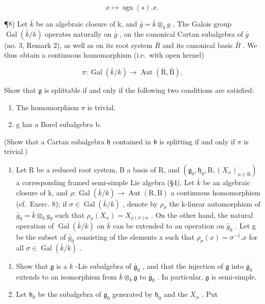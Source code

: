 \[
x \mapsto \operatorname{sgn} (s). x.
\]

¶8) Let \(\bar{k}\) be an algebraic closure of k, and \(\bar{g} = \bar{k} \otimes_{k} g\) . The Galois group \(\operatorname{Gal}(\bar{k}/k)\) operates naturally on \(\bar{g}\) , on the canonical Cartan subalgebra of \(\bar{g}\) (no. 3, Remark 2), as well as on its root system \(\bar{R}\) and its canonical basis \(\bar{B}\) . We thus obtain a continuous homomorphism (i.e.~with open kernel)

\[
\pi : \operatorname{Gal} (\bar {k} / k) \to \operatorname{Aut} (\bar {\mathrm{R}}, \bar {\mathrm{B}}).
\]

Show that \(\mathfrak{g}\) is splittable if and only if the following two conditions are satisfied:

\begin{enumerate}
\def\labelenumi{(\roman{enumi})}
\item
  The homomorphism \(\pi\) is trivial.
\item
  g has a Borel subalgebra b.
\end{enumerate}

(Show that a Cartan subalgebra \(\mathfrak{h}\) contained in \(\mathfrak{b}\) is splitting if and only if \(\pi\) is trivial.)

\begin{enumerate}
\def\labelenumi{\arabic{enumi})}
\setcounter{enumi}{8}
\tightlist
\item
  Let R be a reduced root system, B a basis of R, and \((\mathfrak{g}_{0}, \mathfrak{h}_{0}, \mathrm{B}, (X_{\alpha})_{\alpha \in \mathrm{B}})\) a corresponding framed semi-simple Lie algebra (§4). Let \(\bar{k}\) be an algebraic closure of k, and \(\rho : \operatorname{Gal}(\bar{k}/k) \to \operatorname{Aut}(\mathrm{R}, \mathrm{B})\) a continuous homomorphism (cf.~Exerc. 8); if \(\sigma \in \operatorname{Gal}(\bar{k}/k)\) , denote by \(\rho_{\sigma}\) the k-linear automorphism of \(\bar{g}_{0} = \bar{k} \otimes_{k} g_{0}\) such that \(\rho_{\sigma}(X_{\alpha}) = X_{\rho(\sigma)\alpha}\) . On the other hand, the natural operation of \(\operatorname{Gal}(\bar{k}/k)\) on \(\bar{k}\) can be extended to an operation on \(\bar{g}_{0}\) . Let g be the subset of \(\bar{g}_{0}\) consisting of the elements x such that \(\rho_{\sigma}(x) = \sigma^{-1}.x\) for all \(\sigma \in \operatorname{Gal}(\bar{k}/k)\) .
\end{enumerate}

\begin{enumerate}
\def\labelenumi{\alph{enumi})}
\item
  Show that \(\mathfrak{g}\) is a \(k\) -Lie subalgebra of \(\bar{\mathfrak{g}}_0\) , and that the injection of \(\mathfrak{g}\) into \(\bar{\mathfrak{g}}_0\) extends to an isomorphism from \(\bar{k} \otimes_k \mathfrak{g}\) to \(\bar{\mathfrak{g}}_0\) . In particular, \(\mathfrak{g}\) is semi-simple.
\item
  Let \(\mathfrak{b}_0\) be the subalgebra of \(\mathfrak{g}_0\) generated by \(\mathfrak{h}_0\) and the \(X_{\alpha}\) . Put
\end{enumerate}

